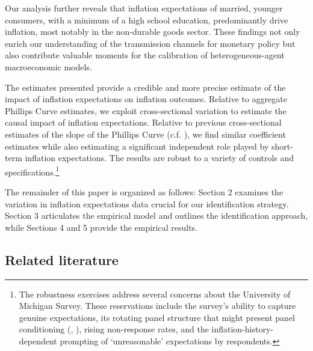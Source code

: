 \documentclass[12pt]{article}
\begin{document}
Our analysis further reveals that inflation expectations of married, younger consumers, with a minimum of a high school education, predominantly drive inflation, most notably in the non-durable goods sector. These findings not only enrich our understanding of the transmission channels for monetary policy but also contribute valuable moments for the calibration of heterogeneous-agent macroeconomic models.

The estimates presented provide a credible and more precise estimate of the impact of inflation expectations on inflation outcomes.  Relative to aggregate Phillips Curve estimates, we exploit cross-sectional variation to estimate the causal impact of inflation expectations.  Relative to previous cross-sectional estimates of the slope of the Phillips Curve (c.f. \cite{NakamuraSteinsson:QJE2022}), we find similar coefficient estimates while also estimating a significant independent role played by short-term inflation expectations.  The results are robust to a variety of controls and specifications.\footnote{The robustness exercises address several concerns about the University of Michigan Survey.  These reservations include the survey's ability to capture genuine expectations, its rotating panel structure that might present panel conditioning (\cite{Binder:EL}, \cite{BinderKim:AEJM2021}), rising non-response rates, and the inflation-history-dependent prompting of `unreasonable' expectations by respondents.} 

The remainder of this paper is organized as follows: Section 2 examines the variation in inflation expectations data crucial for our identification strategy. Section 3 articulates the empirical model and outlines the identification approach, while Sections 4 and 5 provide the empirical results.

\subsection{Related literature}
\end{document}
